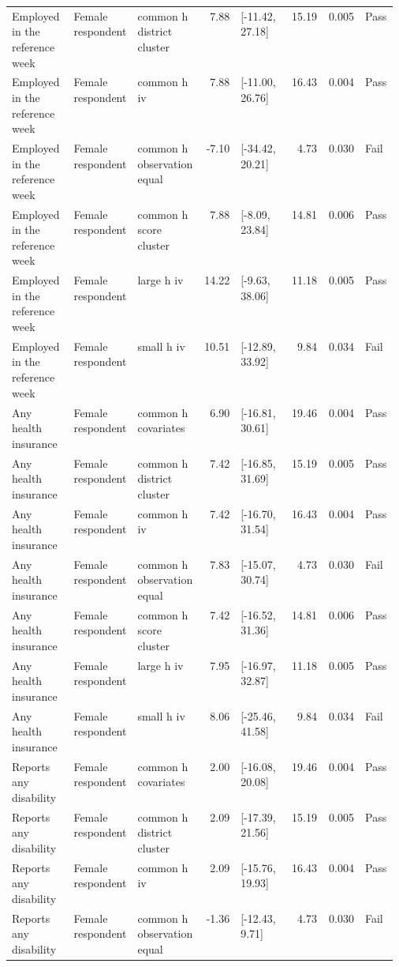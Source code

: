 \begin{longtable}{@{}p{0.16\linewidth}p{0.14\linewidth}p{0.14\linewidth}rp{0.13\linewidth}rrl@{}}
Employed in the reference week & Female respondent & common h district cluster & 7.88 & [-11.42, 27.18] & 15.19 & 0.005 & Pass \\
Employed in the reference week & Female respondent & common h iv & 7.88 & [-11.00, 26.76] & 16.43 & 0.004 & Pass \\
Employed in the reference week & Female respondent & common h observation equal & -7.10 & [-34.42, 20.21] & 4.73 & 0.030 & Fail \\
Employed in the reference week & Female respondent & common h score cluster & 7.88 & [-8.09, 23.84] & 14.81 & 0.006 & Pass \\
Employed in the reference week & Female respondent & large h iv & 14.22 & [-9.63, 38.06] & 11.18 & 0.005 & Pass \\
Employed in the reference week & Female respondent & small h iv & 10.51 & [-12.89, 33.92] & 9.84 & 0.034 & Fail \\
Any health insurance & Female respondent & common h covariates & 6.90 & [-16.81, 30.61] & 19.46 & 0.004 & Pass \\
Any health insurance & Female respondent & common h district cluster & 7.42 & [-16.85, 31.69] & 15.19 & 0.005 & Pass \\
Any health insurance & Female respondent & common h iv & 7.42 & [-16.70, 31.54] & 16.43 & 0.004 & Pass \\
Any health insurance & Female respondent & common h observation equal & 7.83 & [-15.07, 30.74] & 4.73 & 0.030 & Fail \\
Any health insurance & Female respondent & common h score cluster & 7.42 & [-16.52, 31.36] & 14.81 & 0.006 & Pass \\
Any health insurance & Female respondent & large h iv & 7.95 & [-16.97, 32.87] & 11.18 & 0.005 & Pass \\
Any health insurance & Female respondent & small h iv & 8.06 & [-25.46, 41.58] & 9.84 & 0.034 & Fail \\
Reports any disability & Female respondent & common h covariates & 2.00 & [-16.08, 20.08] & 19.46 & 0.004 & Pass \\
Reports any disability & Female respondent & common h district cluster & 2.09 & [-17.39, 21.56] & 15.19 & 0.005 & Pass \\
Reports any disability & Female respondent & common h iv & 2.09 & [-15.76, 19.93] & 16.43 & 0.004 & Pass \\
Reports any disability & Female respondent & common h observation equal & -1.36 & [-12.43, 9.71] & 4.73 & 0.030 & Fail \\

\end{longtable}
